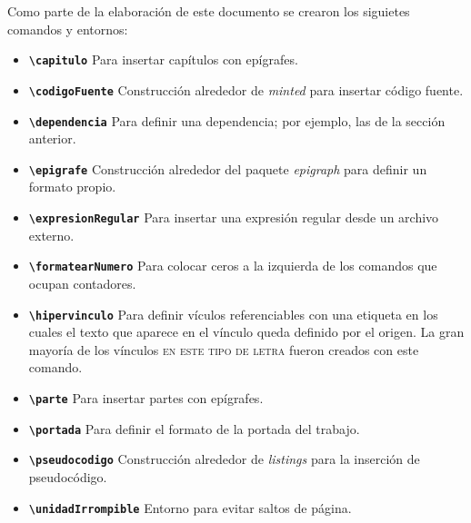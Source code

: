 Como parte de la elaboración de este documento se crearon los siguietes
comandos y entornos:

\begin{itemize}

  \item \textbf{\texttt{{\textbackslash}capitulo}}
    Para insertar capítulos con epígrafes.

  \item \textbf{\texttt{{\textbackslash}codigoFuente}}
    Construcción alrededor de \textit{minted} para insertar código fuente.

  \item \textbf{\texttt{{\textbackslash}dependencia}}
    Para definir una dependencia; por ejemplo, las de la sección anterior.

  \item \textbf{\texttt{{\textbackslash}epigrafe}}
    Construcción alrededor del paquete \textit{epigraph} para definir un
    formato propio.

  \item \textbf{\texttt{{\textbackslash}expresionRegular}}
    Para insertar una expresión regular desde un archivo externo.

  \item \textbf{\texttt{{\textbackslash}formatearNumero}}
    Para colocar ceros a la izquierda de los comandos que ocupan contadores.

  \item \textbf{\texttt{{\textbackslash}hipervinculo}}
    Para definir vículos referenciables con una etiqueta en los cuales el
    texto que aparece en el vínculo queda definido por el origen. La gran
    mayoría de los vínculos \textsc{en este tipo de letra} fueron creados
    con este comando.

  \item \textbf{\texttt{{\textbackslash}parte}}
    Para insertar partes con epígrafes.

  \item \textbf{\texttt{{\textbackslash}portada}}
    Para definir el formato de la portada del trabajo.

  \item \textbf{\texttt{{\textbackslash}pseudocodigo}}
    Construcción alrededor de \textit{listings} para la inserción de
    pseudocódigo.

  \item \textbf{\texttt{{\textbackslash}unidadIrrompible}}
    Entorno para evitar saltos de página.


\end{itemize}
